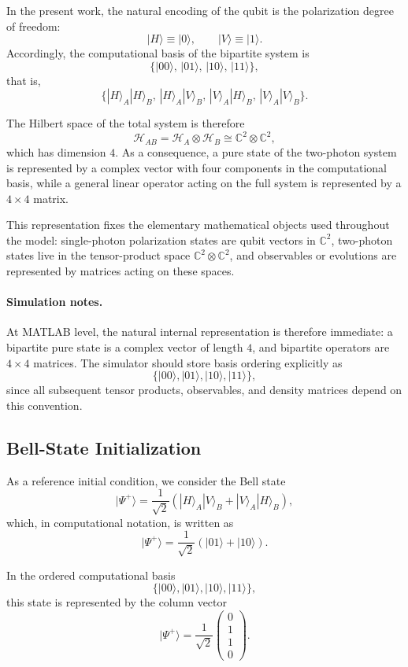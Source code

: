 \documentclass[a4paper]{article}
\begin{document}
In the present work, the natural encoding of the qubit is the polarization degree of freedom:
\[
|H\rangle \equiv |0\rangle,
\qquad
|V\rangle \equiv |1\rangle.
\]
Accordingly, the computational basis of the bipartite system is
\[
\{
|00\rangle,\,
|01\rangle,\,
|10\rangle,\,
|11\rangle
\},
\]
that is,
\[
\{
|H\rangle_A |H\rangle_B,\,
|H\rangle_A |V\rangle_B,\,
|V\rangle_A |H\rangle_B,\,
|V\rangle_A |V\rangle_B
\}.
\]

The Hilbert space of the total system is therefore
\[
\mathcal{H}_{AB} = \mathcal{H}_A \otimes \mathcal{H}_B
\cong \mathbb{C}^2 \otimes \mathbb{C}^2,
\]
which has dimension \(4\). As a consequence, a pure state of the two-photon system is represented by a complex vector with four components in the computational basis, while a general linear operator acting on the full system is represented by a \(4 \times 4\) matrix.

This representation fixes the elementary mathematical objects used throughout the model: single-photon polarization states are qubit vectors in \(\mathbb{C}^2\), two-photon states live in the tensor-product space \(\mathbb{C}^2 \otimes \mathbb{C}^2\), and observables or evolutions are represented by matrices acting on these spaces.

\paragraph{Simulation notes.}
At MATLAB level, the natural internal representation is therefore immediate: a bipartite pure state is a complex vector of length \(4\), and bipartite operators are \(4 \times 4\) matrices. The simulator should store basis ordering explicitly as
\[
\{|00\rangle,|01\rangle,|10\rangle,|11\rangle\},
\]
since all subsequent tensor products, observables, and density matrices depend on this convention.

\subsection{Bell-State Initialization}

As a reference initial condition, we consider the Bell state
\[
|\Psi^{+}\rangle
=
\frac{1}{\sqrt{2}}
\left(
|H\rangle_A |V\rangle_B
+
|V\rangle_A |H\rangle_B
\right),
\]
which, in computational notation, is written as
\[
|\Psi^{+}\rangle
=
\frac{1}{\sqrt{2}}
\left(
|01\rangle + |10\rangle
\right).
\]

In the ordered computational basis
\[
\{|00\rangle, |01\rangle, |10\rangle, |11\rangle\},
\]
this state is represented by the column vector
\[
|\Psi^{+}\rangle
=
\frac{1}{\sqrt{2}}
\begin{pmatrix}
0\\
1\\
1\\
0
\end{pmatrix}.
\]
\end{document}
